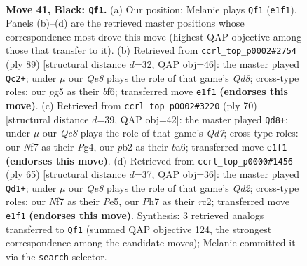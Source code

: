 \documentclass[11pt]{article}
\begin{document}
\clearpage

\begin{figure}[p]\centering
\begin{subfigure}{0.46\textwidth}\centering
\resizebox{\linewidth}{!}{%
\newchessgame
\chessboard[
  setfen={1k6/p1pQ1npp/1p2p3/2p3P1/8/2P5/KP6/4q3 b - - 3 41},
  showmover=false,
  pgfstyle=straightmove, color=movearrow, markmove={e1-f1}
]}
\caption{}
\end{subfigure}\hfill
\begin{subfigure}{0.46\textwidth}\centering
\resizebox{\linewidth}{!}{%
\newchessgame
\chessboard[
  setfen={4Q3/5p1k/p1n2Bp1/1p4Pp/8/3P3P/7K/3q4 b - - 15 45},
  showmover=false,
  pgfstyle=straightmove, color=movearrow, markmove={d1-c2}
]}
\caption{}
\end{subfigure}
\\[4pt]
\begin{subfigure}{0.46\textwidth}\centering
\resizebox{\linewidth}{!}{%
\newchessgame
\chessboard[
  setfen={5k2/p2Q4/bpp4p/5P2/5qP1/7P/PP6/1K6 w - - 7 36},
  showmover=false,
  pgfstyle=straightmove, color=movearrow, markmove={d7-d8}
]}
\caption{}
\end{subfigure}\hfill
\begin{subfigure}{0.46\textwidth}\centering
\resizebox{\linewidth}{!}{%
\newchessgame
\chessboard[
  setfen={6k1/3q3p/1p3Qp1/p3p3/P7/6PP/2R2P2/6K1 b - - 0 33},
  showmover=false,
  pgfstyle=straightmove, color=movearrow, markmove={d7-d1}
]}
\caption{}
\end{subfigure}
\caption{\textbf{Move 41, Black: \texttt{Qf1}.} (a) Our position; Melanie plays \texttt{Qf1} (\texttt{e1f1}). Panels (b)--(d) are the retrieved master positions whose correspondence most drove this move (highest QAP objective among those that transfer to it). (b) Retrieved from \texttt{ccrl\_top\_p0002\#2754} (ply 89) [structural distance $d$=32, QAP obj=46]: the master played \texttt{Qc2+}; under $\mu$ our \emph{Qe8} plays the role of that game's \emph{Qd8}; cross-type roles: our \emph{p}g5 as their \emph{b}f6; transferred move \texttt{e1f1} \textbf{(endorses this move)}. (c) Retrieved from \texttt{ccrl\_top\_p0002\#3220} (ply 70) [structural distance $d$=39, QAP obj=42]: the master played \texttt{Qd8+}; under $\mu$ our \emph{Qe8} plays the role of that game's \emph{Qd7}; cross-type roles: our \emph{N}f7 as their \emph{P}g4, our \emph{p}b2 as their \emph{b}a6; transferred move \texttt{e1f1} \textbf{(endorses this move)}. (d) Retrieved from \texttt{ccrl\_top\_p0000\#1456} (ply 65) [structural distance $d$=37, QAP obj=36]: the master played \texttt{Qd1+}; under $\mu$ our \emph{Qe8} plays the role of that game's \emph{Qd2}; cross-type roles: our \emph{N}f7 as their \emph{P}e5, our \emph{P}h7 as their \emph{r}c2; transferred move \texttt{e1f1} \textbf{(endorses this move)}. Synthesis: 3 retrieved analogs transferred to \texttt{Qf1} (summed QAP objective 124, the strongest correspondence among the candidate moves); Melanie committed it via the \texttt{search} selector.}
\label{fig:thought-m81}
\end{figure}
\end{document}

